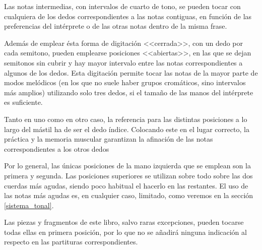 Las notas intermedias, con intervalos de cuarto de tono, se pueden tocar con cualquiera de los dedos correspondientes a las notas contiguas, en función de las preferencias del intérprete o de las otras notas dentro de la misma frase.

Además de emplear ésta forma de digitación <<cerrada>>, con un dedo por cada semitono, pueden emplearse posiciones <<abiertas>>, en las que se dejan semitonos sin cubrir y hay mayor intervalo entre las notas correspondientes a algunos de los dedos. Esta digitación permite tocar las notas de la mayor parte de modos melódicos (en los que no suele haber grupos cromáticos, sino intervalos más amplios) utilizando solo tres dedos, si el tamaño de las manos del intérprete es suficiente.

Tanto en uno como en otro caso, la referencia para las distintas posiciones a lo largo del mástil ha de ser el dedo índice. Colocando este en el lugar correcto, la práctica y la memoria muscular garantizan la afinación de las notas correspondientes a los otros dedos

Por lo general, las únicas posiciones de la mano izquierda que se emplean son la primera y segunda. Las posiciones superiores se utilizan sobre todo sobre las dos cuerdas más agudas, siendo poco habitual el hacerlo en las restantes. El uso de las notas más agudas es, en cualquier caso, limitado, como veremos en la sección \ref{sistema_tonal}.

Las piezas y fragmentos de este libro, salvo raras excepciones, pueden tocarse todas ellas en primera posición, por lo que no se añadirá ninguna indicación al respecto en las partituras correspondientes.



